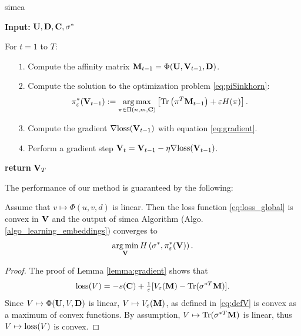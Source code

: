 \begin{algorithm}[h]
\caption{\ac{simca}}
\label{algo_learning_embeddings}
\begin{flushleft}
    \textbf{Input:} $\mathbf{U}, \mathbf{D}, \mathbf{C}, \sigma^*$

    For $t =1$ to $T$:

    \begin{itemize}
    	\item[$1.$] Compute the affinity matrix $\mathbf{M}_{t-1} = \Phi(\mathbf{U},\mathbf{V}_{t-1},\mathbf{D})$.

    	\item[$2.$]  Compute the solution to the optimization problem \eqref{eq:piSinkhorn}:
    	\begin{equation*}
    	\pi_{\varepsilon}^*(\mathbf{V}_{t-1}) := \operatorname*{arg\,max}_{\pi \in \Pi(n,m,\mathbf{C})} \left[{\rm Tr}\left( \pi^T \mathbf{M}_{t-1} \right) + \varepsilon H(\pi) \right].
    	\end{equation*}

    	\item[$3.$]  Compute the gradient $\nabla \mathrm{loss}(\mathbf{V}_{t-1})$ with equation \eqref{eq:gradient}.

    	\item[$4.$]  Perform a gradient step $\mathbf{V}_{t} = \mathbf{V}_{t-1} - \eta \nabla \mathrm{loss}(\mathbf{V}_{t-1})$.
    \end{itemize}
\textbf{return} $\mathbf{V}_T$
\end{flushleft}
\end{algorithm}

The performance of our method is guaranteed by the following:
\begin{lemma}\label{lemma:convergence_guarantee}
Assume that $v \mapsto \Phi(u,v,d)$ is linear. Then the loss function \eqref{eq:loss_global} is convex in $\mathbf{V}$ and the output of \ac{simca} Algorithm (Algo. \ref{algo_learning_embeddings}) converges to
\begin{equation*}
    \operatorname*{arg\,min}_{\mathbf{V}} H\left(\sigma^*,\pi^*_{\varepsilon}(\mathbf{V})\right).
\end{equation*}
\end{lemma}

\begin{proof}
The proof of Lemma \ref{lemma:gradient} shows that
\begin{equation*}
    \mathrm{loss}(V) = -s(\mathbf{C}) + \tfrac{1}{\varepsilon} [
          V_\varepsilon(\mathbf{M}) - {\rm Tr}(\sigma^{*T}\mathbf{M})].
\end{equation*}
Since $V \mapsto \Phi(\mathbf{U},V,\mathbf{D})$ is linear, $V \mapsto V_\varepsilon(\mathbf{M})$, as defined in \eqref{eq:defV} is convex as a maximum of convex functions. By assumption, $V \mapsto {\rm Tr}(\sigma^{*T}\mathbf{M})$ is linear, thus $V \mapsto \mathrm{loss}(V)$ is convex.
\end{proof}

